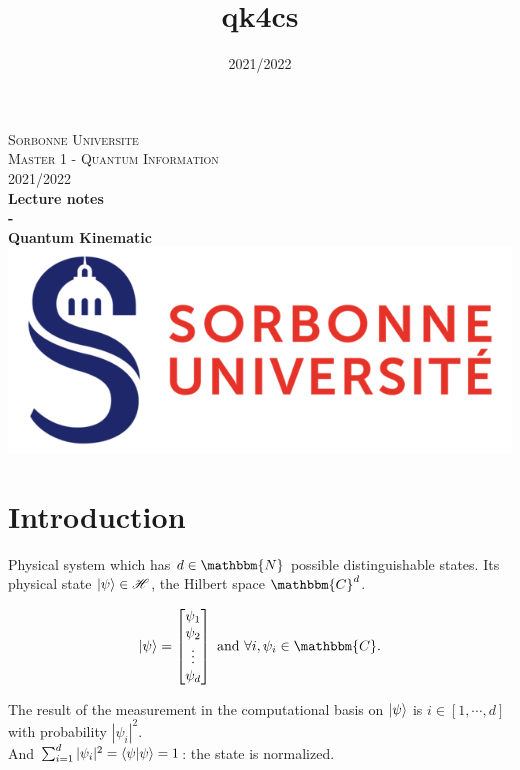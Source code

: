 \documentclass{article}
\title{qk4cs}
\author{}
\date{2021/2022}
\begin{document}
\begin{titlepage}
\begin{center}

\textsc{\LARGE Sorbonne Universite} \\[1cm]
\textsc{\LARGE Master 1 - Quantum Information} \\[1cm]
\textsc{\Large 2021/2022} \\[7cm]


{\huge \bfseries Lecture notes} \\[0.5cm]
{\huge \bfseries -} \\[0.5cm]
{\huge \bfseries Quantum Kinematic} \\[4cm]
\vfill
\includegraphics[scale=0.6]{su.png}
\end{center}
\end{titlepage}

\tableofcontents

\newpage

\section{Introduction}
Physical system which has $d \in \mathbbm{N}$ possible distinguishable states.
Its physical state $\ket{\psi} \in \mathscr{H}$, the Hilbert space $\mathbbm{C}^d$.

\begin{equation}
    \ket{\psi} = \begin{bmatrix} \psi_1\\ \psi_2 \\ \vdots \\ \psi_d\end{bmatrix}
    \text{ and } \forall i, \psi_i \in \mathbbm{C}.
\end{equation}


\noindent
The result of the measurement in the computational basis on
$\ket{\psi}$
 is $i \in [1, \cdots, d]$ with probability $|\psi_i|^2$.
 \\ \noindent
And $\sum_{i=1}^d |\psi_i|^2 = \braket{\psi|\psi} = 1$: the state is normalized.
\end{document}
